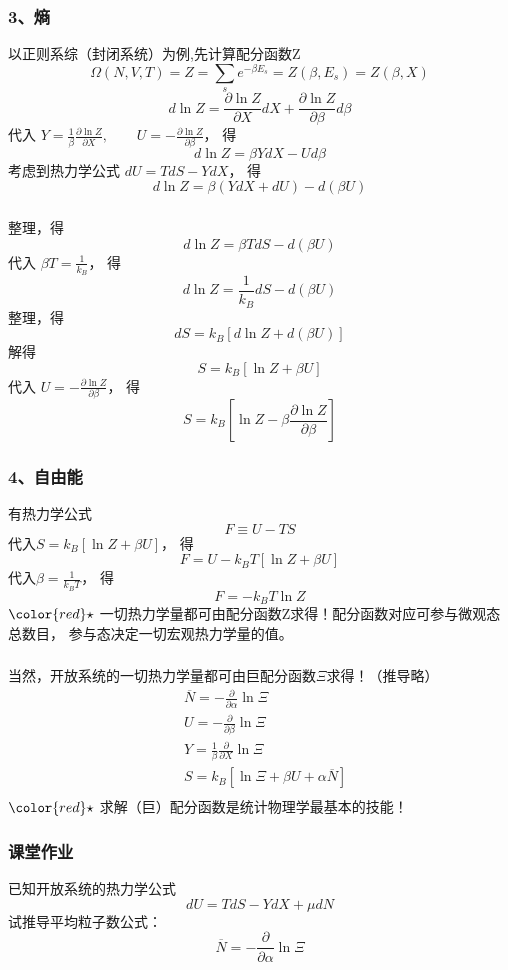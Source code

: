 \begin{frame}
  \frametitle{ 3、熵 }
  以正则系综（封闭系统）为例,先计算配分函数Z
  \[\Omega (N,V,T) = Z = \sum_s e^{-\beta E_s} =Z(\beta, E_s ) = Z(\beta, X )\]
  \[ d \ln Z  = \frac{\partial \ln Z }{\partial X } dX + \frac{\partial \ln Z }{\partial \beta } d \beta  \]
  代入 $ Y = \frac{1}{\beta} \frac{\partial \ln Z}{\partial X }, \qquad U = -  \frac{\partial \ln Z}{\partial \beta } $， 得
  \[ d \ln Z  = \beta Y dX -U d \beta  \]
  考虑到热力学公式 $ dU = TdS - YdX $， 得 
  \[ d \ln Z  = \beta (Y dX + dU) - d(\beta U ) \]
\end{frame} 

\begin{frame}
  \frametitle{}
整理，得
\[ d \ln Z  = \beta TdS - d (\beta U) \]
代入 $\beta T = \frac{1}{k_B}$， 得
\[ d \ln Z  = \frac{1}{k_B} dS - d (\beta U) \]
整理，得
\[ dS = k_B \left[ d \ln Z + d (\beta U) \right] \]
解得 
\[ S = k_B \left[  \ln Z +  \beta U \right] \]
代入 $U = -  \frac{\partial \ln Z}{\partial \beta } $， 得 
\[ \boxed{S = k_B \left[  \ln Z -  \beta \frac{\partial \ln Z}{\partial \beta }  \right]} \]
\end{frame} 

\begin{frame}
  \frametitle{ 4、自由能}
  有热力学公式
  \[ F \equiv  U - TS \]
  代入$S = k_B \left[  \ln Z +  \beta U \right]$， 得 
  \[ F =  U - k_BT \left[  \ln Z +  \beta U \right] \]
  代入$\beta = \frac{1}{k_B T} $， 得 
  \[ \boxed{F =  - k_BT \ln Z }\]
  ${\color{red}\star}$ 一切热力学量都可由配分函数Z求得！配分函数对应可参与微观态总数目， 参与态决定一切宏观热力学量的值。
\end{frame} 

\begin{frame}
  \frametitle{}
当然，开放系统的一切热力学量都可由巨配分函数$\Xi$求得！（推导略） 
\[
\begin{aligned}
  & \boxed{\overline{N} = - \frac{\partial }{\partial \alpha } \ln \Xi}  \\
  &U = - \frac{\partial }{\partial \beta} \ln \Xi \\
  &Y = \frac{1}{\beta} \frac{\partial }{\partial X} \ln \Xi \\
  &S = k_B [ \ln \Xi + \beta U + \alpha \overline{N} ]\\
\end{aligned} 
  \]
  ${\color{red}\star}$ 求解（巨）配分函数是统计物理学最基本的技能！
\end{frame} 

\begin{frame}[label=current]
  \frametitle{课堂作业}
  已知开放系统的热力学公式 $$ dU = TdS - YdX + \mu dN $$ 试推导平均粒子数公式：
  \[\overline{N} = - \frac{\partial }{\partial \alpha } \ln \Xi \]
\end{frame} 

